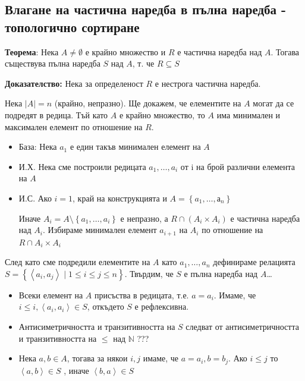 \documentclass{article}
\renewcommand{\\}{\newline}
\newcommand{\sep}{\;|\;}
\newcommand{\doc}{\textbf{Доказателство: }}
\begin{document}
    \subsection{Влагане на частична наредба в пълна наредба - топологично сортиране }
    \textbf{Теорема}: Нека \(A \not=\emptyset\) е крайно множество и \(R\) е частична наредба над \(A\). Тогава съществува пълна наредба \(S\) над \(A\), т. че \(R \subseteq S\)
     
    \doc Нека за определеност \(R\) е нестрога частична наредба.   

    Нека \(\left|A\right| = n\) (крайно, непразно). Ще докажем, че елементите на \(A\) могат да се подредят в редица. Тъй като \(A\) е крайно множество, то \(A\) има минимален и максимален елемент по отношение на \(R\). 
    \begin{itemize}
        \item База: Нека \(a_1\) е един такъв минимален елемент на \(A\) 
        \item И.Х. Нека сме построили редицата \(a_1,\dots, a_{i}\) от i на брой различни елемента на \(A\) 
        \item И.С. Ако \(i=1\), край на конструкцията и \(A = \left\{a_1,\dots, а_n\right\}\)   

          Иначе \(A_{i} = A \setminus \left\{a_1,\dots,a_i\right\}\) е непразно, а \(R \cap (A_i \times A_i)\) е частична наредба над \(A_i\). Избираме минимален елемент \(a_{i+1}\) на \(A_i\) по отношение на \(R \cap A_i \times A_i\)      
    \end{itemize}

    След като сме подредили елементите на \(A\) като \(a_1,\dots,a_n\) дефинираме релацията \(S = \left\{\left\langle a_i, a_j\right\rangle\sep 1 \leq i \leq j \leq n\right\}\). Твърдим, че \(S\) е пълна наредба над \(A\)\dots

    \begin{itemize}
        \item Всеки елемент на \(A\) присъства в редицата, т.е. \(a = a_i\). Имаме, че \(i \leq i, \left\langle a_i, a_i\right\rangle \in S\), откъдето \(S\) е рефлексивна.   
        \item Антисиметричността и транзитивността на \(S\) следват от антисиметричността и транзитивността на \(\leq\) над \(\mathbb{N}\) ???    
        \item Нека \(a, b \in A\), тогава за някои \(i, j\) имаме, че \(a = a_i, b = b_j\). Ако \(i \leq j\) то \(\left\langle a, b\right\rangle\in S\) , иначе \(\left\langle b, a\right\rangle\in S\)      
    \end{itemize}
\end{document}
